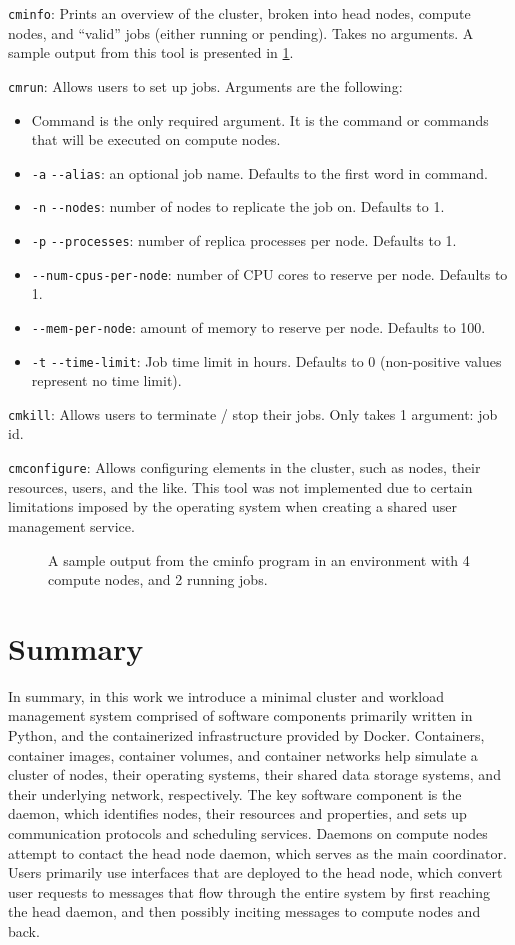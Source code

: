 \documentclass[sigconf]{acmart}
\begin{document}
\verb|cminfo|: Prints an overview of the cluster, broken into head nodes, compute nodes, and ``valid''
jobs (either running or pending). Takes no arguments. A sample output from this tool is presented in \cref{fig:cminfo}.

\verb|cmrun|: Allows users to set up jobs. Arguments are the following:
\begin{itemize}
    \item Command is the only required argument. It is the command or commands that will be executed on compute nodes.
    \item \verb|-a| \verb|--alias|: an optional job name. Defaults to the first word in command.
    \item \verb|-n| \verb|--nodes|: number of nodes to replicate the job on. Defaults to 1.
    \item \verb|-p| \verb|--processes|: number of replica processes per node. Defaults to 1.
    \item \verb|--num-cpus-per-node|: number of CPU cores to reserve per node. Defaults to 1.
    \item \verb|--mem-per-node|: amount of memory to reserve per node. Defaults to 100.
    \item \verb|-t| \verb|--time-limit|: Job time limit in hours. Defaults to 0 (non-positive values represent no time limit).
\end{itemize}

\verb|cmkill|: Allows users to terminate / stop their jobs. Only takes 1 argument: job id.

\verb|cmconfigure|: Allows configuring elements in the cluster, such as nodes, their resources, users, and the
    like. This tool was not implemented due to certain limitations imposed by the operating system when creating a shared
    user management service.

\begin{figure}[ht]
    \centering
    
    \caption{A sample output from the cminfo program in an environment with 4 compute nodes, and 2 running jobs.}
    \label{fig:cminfo}
\end{figure}

\section{Summary}
In summary, in this work we introduce a minimal cluster and workload management system comprised of software components
primarily written in Python, and the containerized infrastructure provided by Docker.
Containers, container images, container volumes, and container networks help simulate a cluster of nodes, their operating
systems, their shared data storage systems, and their underlying network, respectively.
The key software component is the daemon, which identifies nodes, their resources and properties, and sets up communication
protocols and scheduling services. Daemons on compute nodes attempt to contact the head node daemon, which serves as the main
coordinator. 
Users primarily use interfaces that are deployed to the head node, which convert user requests to messages that flow through the
entire system by first reaching the head daemon, and then possibly inciting messages to compute nodes and back.
\end{document}
